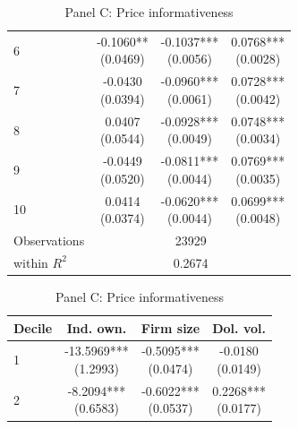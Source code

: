 \begin{table}[!htbp]
\begin{threeparttable}
\begin{minipage}[t]{0.46\textwidth}
\begin{subtable}[t]{\linewidth}
\begin{tabular}{@{}lccc@{}}
6 & \shortstack{-0.1060**\\(0.0469)} & \shortstack{-0.1037***\\(0.0056)} & \shortstack{0.0768***\\(0.0028)} \\
7 & \shortstack{-0.0430\\(0.0394)} & \shortstack{-0.0960***\\(0.0061)} & \shortstack{0.0728***\\(0.0042)} \\
8 & \shortstack{0.0407\\(0.0544)} & \shortstack{-0.0928***\\(0.0049)} & \shortstack{0.0748***\\(0.0034)} \\
9 & \shortstack{-0.0449\\(0.0520)} & \shortstack{-0.0811***\\(0.0044)} & \shortstack{0.0769***\\(0.0035)} \\
10 & \shortstack{0.0414\\(0.0374)} & \shortstack{-0.0620***\\(0.0044)} & \shortstack{0.0699***\\(0.0048)} \\
\midrule
Observations & \multicolumn{3}{c}{23929} \\
within $R^2$ & \multicolumn{3}{c}{0.2674} \\
\bottomrule
\end{tabular}
\end{subtable}
\end{minipage}
\vspace{0.5em}
\noindent\begin{minipage}[t]{0.56\textwidth}\centering
\begin{subtable}[t]{\linewidth}
\caption{Panel C: Price informativeness}
\centering
\begin{tabular}{@{}lccc@{}}
\toprule
Decile & Ind. own. & Firm size & Dol. vol. \\
\midrule
1 & \shortstack{-13.5969***\\(1.2993)} & \shortstack{-0.5095***\\(0.0474)} & \shortstack{-0.0180\\(0.0149)} \\
2 & \shortstack{-8.2094***\\(0.6583)} & \shortstack{-0.6022***\\(0.0537)} & \shortstack{0.2268***\\(0.0177)} \\

\end{tabular}
\end{subtable}
\end{minipage}
\end{threeparttable}
\end{table}
